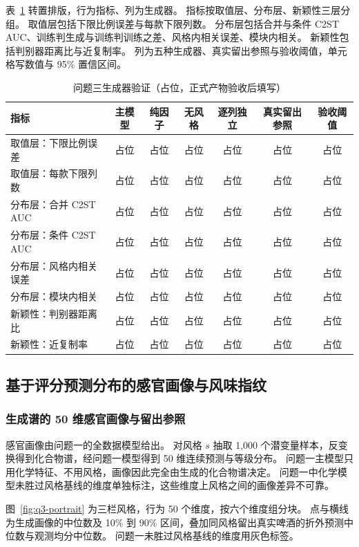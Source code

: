 表~\ref{tab:q3-gen} 转置排版，行为指标、列为生成器。
指标按取值层、分布层、新颖性三层分组。
取值层包括下限比例误差与每款下限列数。
分布层包括合并与条件 C2ST AUC、训练判生成与训练判训练之差、风格内相关误差、模块内相关。
新颖性包括判别器距离比与近复制率。
列为五种生成器、真实留出参照与验收阈值，单元格写数值与 95\% 置信区间。

\begin{table}[H]
\centering\small
\caption{问题三生成器验证（占位，正式产物验收后填写）}
\label{tab:q3-gen}
\begin{tabular}{lcccccc}
\toprule
指标 & 主模型 & 纯因子 & 无风格 & 逐列独立 & 真实留出参照 & 验收阈值 \\
\midrule
取值层：下限比例误差 & 占位 & 占位 & 占位 & 占位 & 占位 & 占位 \\
取值层：每款下限列数 & 占位 & 占位 & 占位 & 占位 & 占位 & 占位 \\
分布层：合并 C2ST AUC & 占位 & 占位 & 占位 & 占位 & 占位 & 占位 \\
分布层：条件 C2ST AUC & 占位 & 占位 & 占位 & 占位 & 占位 & 占位 \\
分布层：风格内相关误差 & 占位 & 占位 & 占位 & 占位 & 占位 & 占位 \\
分布层：模块内相关 & 占位 & 占位 & 占位 & 占位 & 占位 & 占位 \\
新颖性：判别器距离比 & 占位 & 占位 & 占位 & 占位 & 占位 & 占位 \\
新颖性：近复制率 & 占位 & 占位 & 占位 & 占位 & 占位 & 占位 \\
\bottomrule
\end{tabular}
\end{table}

\subsection{基于评分预测分布的感官画像与风味指纹}

\subsubsection{生成谱的 50 维感官画像与留出参照}

感官画像由问题一的全数据模型给出。
对风格 $s$ 抽取 1,000 个潜变量样本，反变换得到化合物谱，经问题一模型得到 50 维连续预测与等级分布。
问题一主模型只用化学特征、不用风格，画像因此完全由生成的化合物谱决定。
问题一中化学模型未胜过风格基线的维度单独标注，这些维度上风格之间的画像差异不可靠。

图~\ref{fig:q3-portrait} 为三栏风格，行为 50 个维度，按六个维度组分块。
点与横线为生成画像的中位数及 10\% 到 90\% 区间，叠加同风格留出真实啤酒的折外预测中位数与观测均分中位数。
问题一未胜过风格基线的维度用灰色标签。

